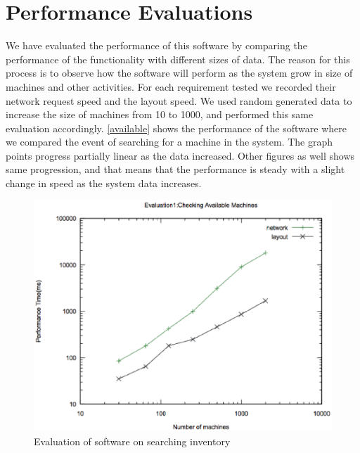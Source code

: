 \section{Performance Evaluations}
We have evaluated the performance of this software by comparing the performance of the functionality with different sizes of data. The reason for this process is to observe how the software will perform as the system grow in size of machines and other activities. For each requirement tested we recorded their network request speed and the  layout speed. We used random generated data to increase the size of machines from 10 to 1000, and performed this same evaluation accordingly. \autoref{available} shows the performance of the software where we compared the event of searching for a machine in the system. The graph points progress partially linear as the data increased. Other figures as well shows same progression, and that means that the performance is steady with a slight change in speed as the system data increases.
\begin{figure}[h]
 \includegraphics[width=\linewidth]{available.eps}
  \caption{Evaluation of software on searching inventory}
  \label{available}
\end{figure}

